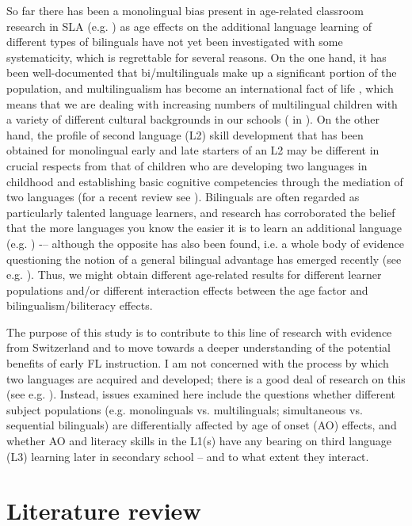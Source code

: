 \documentclass[output=paper,modfonts,nonflat,newtxmath]{langsci/langscibook}
\begin{document}
So far there has been a monolingual bias present in age-related classroom research in SLA (e.g. \citealt{GarciaMayoGarciaLecumberri2003, Muñoz2006}) as age effects on the additional language learning of different types of bilinguals have not yet been investigated with some systematicity, which is regrettable for several reasons. On the one hand, it has been well-documented that bi/multilinguals make up a significant portion of the population, and multilingualism has become an international fact of life \citep{Grosjean2010}, which means that we are dealing with increasing numbers of multilingual children with a variety of different cultural backgrounds in our schools (\citealt{MeijerEtAl2003} in \citealt{MeijerEtAl2003}). On the other hand, the profile of second language (L2) skill development that has been obtained for monolingual early and late starters of an L2 may be different in crucial respects from that of children who are developing two languages in childhood and establishing basic cognitive competencies through the mediation of two languages (for a recent review see \citealt{BialystokEtAl2016}). Bilinguals are often regarded as particularly talented language learners, and research has corroborated the belief that the more languages you know the easier it is to learn an additional language (e.g. \citealt{CenozValencia1994}) -– although the opposite has also been found, i.e. a whole body of evidence questioning the notion of a general bilingual advantage has emerged recently (see e.g. \citealt{deBot2017}). Thus, we might obtain different age-related results for different learner populations and/or different interaction effects between the age factor and bilingualism/biliteracy effects.

The purpose of this study is to contribute to this line of research with evidence from Switzerland and to move towards a deeper understanding of the potential benefits of early FL instruction. I am not concerned with the process by which two languages are acquired and developed; there is a good deal of research on this (see e.g. \citealt{AroninHufeisen2009}). Instead, issues examined here include the questions whether different subject populations (e.g. monolinguals vs. multilinguals; simultaneous vs. sequential bilinguals) are differentially affected by age of onset (AO) effects, and whether AO and literacy skills in the L1(s) have any bearing on third language (L3) learning later in secondary school – and to what extent they interact.

\section{Literature review}
\label{sec:pfenninger:2}
\end{document}
